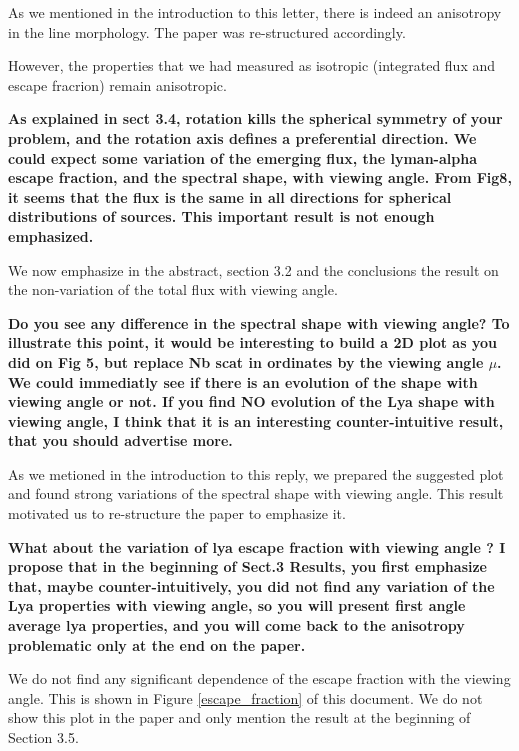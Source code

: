 \documentclass[12pt]{article}
\begin{document}
As we mentioned in the introduction to this letter, there is indeed
an anisotropy in the line morphology. The paper was re-structured
accordingly.

However, the properties that we had measured as isotropic (integrated
flux and escape fracrion) remain anisotropic.


{\bf As explained in sect 3.4, rotation kills the spherical symmetry
  of your problem, and the rotation axis defines a preferential
  direction. We could expect some variation of the emerging flux, the
  lyman-alpha escape fraction, and the spectral shape, with viewing
  angle. From Fig8, it seems that the flux is the same in all
  directions for spherical distributions of sources. This important
  result is not enough emphasized.} 


We now emphasize in the abstract, section 3.2 and the conclusions the
result on the non-variation of the total flux with viewing angle.

{\bf Do you see any difference in the spectral shape with viewing
  angle? To illustrate this point, it would be interesting to build a
  2D plot as you did on Fig 5, but replace Nb scat in ordinates by the
  viewing angle $\mu$. We could immediatly see if there is an
  evolution of the shape with viewing angle or not. If you find NO
  evolution of the Lya shape with viewing angle, I think that it is an
  interesting counter-intuitive result, that you should advertise
  more.} 

As we metioned in the introduction to this reply, we prepared the
suggested plot and found strong variations of the spectral shape with
viewing angle. This result motivated us to re-structure the paper to
emphasize it.


{\bf What about the variation of lya escape fraction with viewing
  angle ? I propose that in the beginning of Sect.3 Results, you first
  emphasize that, maybe counter-intuitively, you did not find any
  variation of the Lya properties with viewing angle, so you will
  present first angle average lya properties, and you will come back
  to the anisotropy problematic only at the end on the paper.} 

We do not find any significant dependence of the escape fraction with
the viewing angle. This is shown in Figure \ref{escape_fraction} of this
document. We do not show this plot in the paper and only mention the
result at the beginning of Section 3.5.
\end{document}
